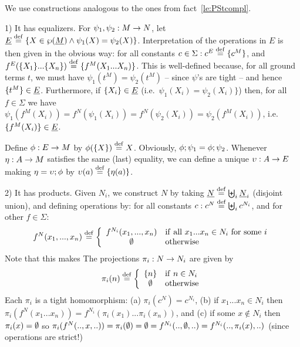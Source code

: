 \documentclass[10pt]{article}
\begin{document}
\begin{Proof}
We use constructions analogous to the ones from
fact~\ref{le:PStcompl}.

1) It has equalizers. For $\psi_1,\psi_2:M\rightarrow N$, let $\underline {E}\stackrel{{\rm \tiny{def}}}=
\{X\in\wp(\underline {M})\land\psi_1(X)=\psi_2(X)\}$. Interpretation of
the operations in $E$ is then given in the obvious way: for all
constants $c\in\Sigma: c^E\stackrel{{\rm \tiny{def}}}= \{c^M\}$, and $f^E(\{X_1\}...\{X_n\})
\stackrel{{\rm \tiny{def}}}= \{f^M(X_1...X_n)\}$.  This is well-defined because, for all
ground terms $t$, we must have $\psi_1(t^M)=\psi_2(t^M)$ -- since
$\psi$'s are tight -- and hence $\{t^M\}\in\underline {E}$.  Furthermore, if
$\{X_i\}\in\underline {E}$ (i.e.\ $\psi_1(X_i)=\psi_2(X_i)\}$) then, for all
$f\in\Sigma$ we have
$\psi_1(f^M(X_i))=f^N(\psi_1(X_i))=f^N(\psi_2(X_i))=\psi_2(f^M(X_i))$,
i.e.\ $\{f^M(X_i)\}\in \underline {E}$.

Define $\phi:E\rightarrow M$ by $\phi(\{X\})\stackrel{{\rm \tiny{def}}}= X$. Obviously,
$\phi;\psi_1=\phi;\psi_2$. Whenever $\eta:A\rightarrow M$
satisfies the same (last) equality, we can define a unique
$\upsilon:A\rightarrow E$ making $\eta=\upsilon;\phi$ by
$\upsilon(a)\stackrel{{\rm \tiny{def}}}=\{\eta(a)\}$.

2) It has products. Given $N_i$, we construct $N$ by taking $\underline {N}\stackrel{{\rm \tiny{def}}}= \biguplus_i \underline {N}_i$ (disjoint union), and defining operations
by: for all constants $c:c^N\stackrel{{\rm \tiny{def}}}= \biguplus_i c^{N_i}$, and for other
$f\in\Sigma:$
\[ 
f^N(x_1,...,x_n)\stackrel{{\rm \tiny{def}}}= 
\left \{ \begin{array}{cl}
         f^{N_i}(x_1,...,x_n) 
         & {\rm if\ all\ } x_1...x_n\in N_i {\rm \ for\ some\ }i \\ 
         \emptyset 
         & {\rm otherwise} 
         \end{array} 
      \right.
\]
Note that this makes 
The projections $\pi_i:N\rightarrow N_i$ are given by 
\[
\pi_i(n)\stackrel{{\rm \tiny{def}}}= \left \{ \begin{array}{cl} \{n\} & {\rm if\ } n\in N_i \\
\emptyset & {\rm otherwise} \end{array} \right.
\]
Each $\pi_i$ is a tight homomorphism: (a) $\pi_i(c^N)=c^{N_i}$, (b) if
$x_1...x_n\in N_i$ then
$\pi_i(f^N(x_1...x_n))=f^{N_i}(\pi_i(x_1)...\pi_i(x_n))$, and (c) if
some $x\not\in N_i$ then $\pi_i(x)=\emptyset$ so
$\pi_i(f^N(..,x,..))=\pi_i(\emptyset)=\emptyset= f^{N_i}(..,\emptyset,..)=
f^{N_i}(..,\pi_i(x),..)$ (since operations are strict!)



\end{Proof}
\end{document}
